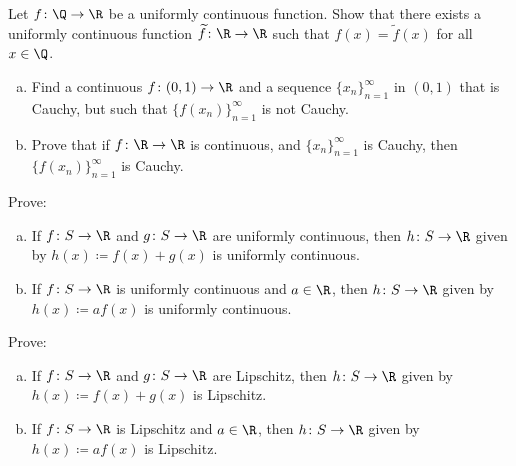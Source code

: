 \begin{exercise}[Challenging]
Let $f \colon \Q \to \R$ be a uniformly continuous function.  Show that
there exists a uniformly continuous function $\widetilde{f} \colon \R \to \R$
such that $f(x) = \widetilde{f}(x)$ for all $x \in \Q$.
\end{exercise}

\begin{samepage}
\begin{exercise}
\leavevmode
\begin{enumerate}[a)]
\item
Find a continuous $f \colon (0,1) \to \R$ and a sequence
$\{ x_n \}_{n=1}^\infty$ in
$(0,1)$ that is Cauchy, but such that $\bigl\{ f(x_n) \bigr\}_{n=1}^\infty$ is not Cauchy.
\item
Prove that if $f \colon \R \to \R$ is continuous,
and $\{ x_n \}_{n=1}^\infty$ is
Cauchy, then $\bigl\{ f(x_n) \bigr\}_{n=1}^\infty$ is Cauchy.
\end{enumerate}
\end{exercise}
\end{samepage}

\begin{samepage}
\begin{exercise}
Prove:
\begin{enumerate}[a)]
\item
If $f \colon S \to \R$ and $g \colon S \to \R$ are uniformly continuous,
then $h \colon S \to \R$ given by $h(x) \coloneqq f(x) + g(x)$
is uniformly continuous.
\item
If $f \colon S \to \R$ is uniformly continuous and $a \in \R$,
then $h \colon S \to \R$ given by $h(x) \coloneqq a f(x)$
is uniformly continuous.
\end{enumerate}
\end{exercise}
\end{samepage}

\begin{exercise}
Prove:
\begin{enumerate}[a)]
\item
If $f \colon S \to \R$ and $g \colon S \to \R$ are Lipschitz,
then $h \colon S \to \R$ given by $h(x) \coloneqq f(x) + g(x)$
is Lipschitz.
\item
If $f \colon S \to \R$ is Lipschitz and $a \in \R$,
then $h \colon S \to \R$ given by $h(x) \coloneqq a f(x)$
is Lipschitz.
\end{enumerate}
\end{exercise}

